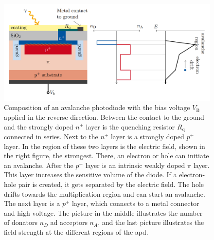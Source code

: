 \begin{figure}
	\centering
	\includegraphics[width=1.\textwidth]{pictures/pin_diode}
	\caption[Illustration of a APD.]{Composition of an avalanche photodiode with the bias voltage $V_\text{B}$ applied in the reverse direction. Between the contact to the ground and the strongly doped $n^+$ layer is the quenching resistor $R_\text{q}$ connected in series. Next to the $n^+$ layer is a strongly doped $p^+$ layer. In the region of these two layers is the electric field, shown in the right figure, the strongest. There, an electron or hole can initiate an avalanche. After the $p^+$ layer is an intrinsic weakly doped $\pi$ layer. This layer increases the sensitive volume of the diode. If a electron-hole pair is created, it gets separated by the electric field. The hole drifts towards the multiplication region and can start an avalanche. The next layer is a $p^+$ layer, which connects to a metal connector and high voltage. The picture in the middle illustrates the number of donators $n_D$ ad acceptors $n_A$, and the last picture illustrates the field strength at the different regions of the \ac{apd}. \cite{}}
	\label{fig:pin_diode}
\end{figure}


